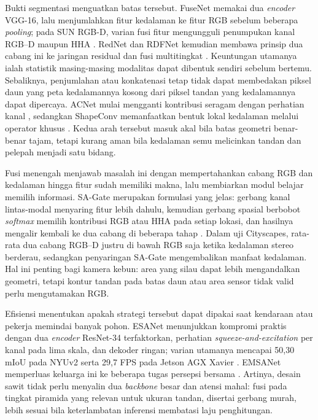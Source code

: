 Bukti segmentasi menguatkan batas tersebut. FuseNet memakai dua \textit{encoder}
VGG-16, lalu menjumlahkan fitur kedalaman ke fitur RGB sebelum beberapa
\textit{pooling}; pada SUN RGB-D, varian fusi fitur mengungguli penumpukan
kanal RGB--D maupun HHA \cite{hazirbas2016fusenet}. RedNet dan RDFNet kemudian
membawa prinsip dua cabang ini ke jaringan residual dan fusi multitingkat
\cite{jiang2018rednet,park2017rdfnet}. Keuntungan utamanya ialah statistik
masing-masing modalitas dapat dibentuk sendiri sebelum bertemu. Sebaliknya,
penjumlahan atau konkatenasi tetap tidak dapat membedakan piksel daun yang
peta kedalamannya kosong dari piksel tandan yang kedalamannya dapat dipercaya.
ACNet mulai mengganti kontribusi seragam dengan perhatian kanal
\cite{hu2019acnet}, sedangkan ShapeConv memanfaatkan bentuk lokal kedalaman
melalui operator khusus \cite{cao2021shapeconv}. Kedua arah tersebut masuk akal
bila batas geometri benar-benar tajam, tetapi kurang aman bila kedalaman semu
melicinkan tandan dan pelepah menjadi satu bidang.

Fusi menengah menjawab masalah ini dengan mempertahankan cabang RGB dan
kedalaman hingga fitur sudah memiliki makna, lalu membiarkan modul belajar
memilih informasi. SA-Gate merupakan formulasi yang jelas: gerbang kanal
lintas-modal menyaring fitur lebih dahulu, kemudian gerbang spasial berbobot
\textit{softmax} memilih kontribusi RGB atau HHA pada setiap lokasi, dan hasilnya
mengalir kembali ke dua cabang di beberapa tahap \cite{chen2020sagate}. Dalam
uji Cityscapes, rata-rata dua cabang RGB--D justru di bawah RGB saja ketika
kedalaman stereo berderau, sedangkan penyaringan SA-Gate mengembalikan manfaat
kedalaman. Hal ini penting bagi kamera kebun: area yang silau dapat lebih
mengandalkan geometri, tetapi kontur tandan pada batas daun atau area sensor
tidak valid perlu mengutamakan RGB.

Efisiensi menentukan apakah strategi tersebut dapat dipakai saat kendaraan
atau pekerja memindai banyak pohon. ESANet menunjukkan kompromi praktis dengan
dua \textit{encoder} ResNet-34 terfaktorkan, perhatian \textit{squeeze-and-excitation}
per kanal pada lima skala, dan dekoder ringan; varian utamanya mencapai 50,30
mIoU pada NYUv2 serta 29,7 FPS pada Jetson AGX Xavier \cite{seichter2021esanet}.
EMSANet memperluas keluarga ini ke beberapa tugas persepsi bersama
\cite{seichter2022emsanet}. Artinya, desain sawit tidak perlu menyalin dua
\textit{backbone} besar dan atensi mahal: fusi pada tingkat piramida yang
relevan untuk ukuran tandan, disertai gerbang murah, lebih sesuai bila
keterlambatan inferensi membatasi laju penghitungan.

